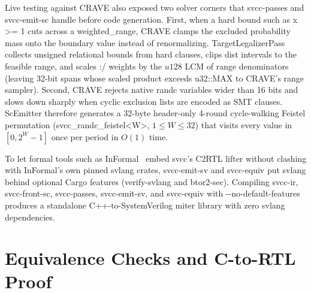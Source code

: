 \documentclass[conference]{IEEEtran}
\newcommand{\code}[1]{{\fontshape{n}\ttfamily #1}}
\begin{document}
Live testing against CRAVE also exposed two solver corners that \code{svcc-passes} and \code{svcc-emit-sc} handle before code generation. First, when a hard bound such as \code{x >= 1} cuts across a \code{weighted\_range}, CRAVE clamps the excluded probability mass onto the boundary value instead of renormalizing. \code{Target\allowbreak Legalizer\allowbreak Pass} collects unsigned relational bounds from hard clauses, clips \code{dist} intervals to the feasible range, and scales \code{:/} weights by the $u128$ LCM of range denominators (leaving 32-bit spans whose scaled product exceeds \code{u32::MAX} to CRAVE's range sampler). Second, CRAVE rejects native \code{randc} variables wider than 16 bits and slows down sharply when cyclic exclusion lists are encoded as SMT clauses. \code{ScEmitter} therefore generates a 32-byte header-only 4-round cycle-walking Feistel permutation (\code{svcc\_randc\_feistel<W>}, $1 \le W \le 32$) that visits every value in $[0, 2^W - 1]$ once per period in $O(1)$ time.

To let formal tools such as \code{InFormal}~\cite{kubavat2026informal} embed \code{svcc}'s C2RTL lifter without clashing with \code{InFormal}'s own pinned \code{svlang} crates, \code{svcc-emit-sv} and \code{svcc-equiv} put \code{svlang} behind optional Cargo features (\code{verify-svlang} and \code{btor2-sec}). Compiling \code{svcc-ir}, \code{svcc-front-sc}, \code{svcc-passes}, \code{svcc-emit-sv}, and \code{svcc-equiv} with \code{-{}-no-default-features} produces a standalone C++-to-SystemVerilog miter library with zero \code{svlang} dependencies.

\section{Equivalence Checks and C-to-RTL Proof}
\label{sec:equiv}
\end{document}
